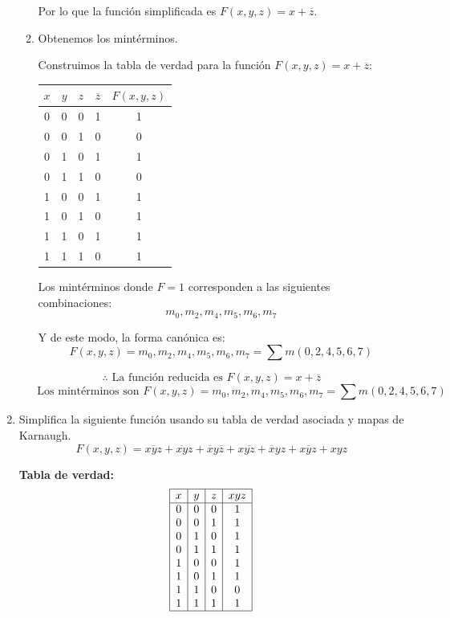 \documentclass[12pt,letterpaper]{article}
\begin{document}
\begin{enumerate}[label=\arabic*.]
\begin{enumerate}[label=\arabic*)]
    Por lo que la funci\'{o}n simplificada es $F(x, y, z) = x + \overline{z}$.

  \item Obtenemos los mint\'{e}rminos.
    
    Construimos la tabla de verdad para la función $F(x, y, z) = x + \overline{z}$:
    \begin{center}
      \begin{tabular}{|c|c|c|c|c|}
        \hline
        $x$ & $y$ & $z$ & $\overline{z}$ & $F(x, y, z)$ \\
        \hline
        0 & 0 & 0 & 1 & 1 \\
        0 & 0 & 1 & 0 & 0 \\
        0 & 1 & 0 & 1 & 1 \\
        0 & 1 & 1 & 0 & 0 \\
        1 & 0 & 0 & 1 & 1 \\
        1 & 0 & 1 & 0 & 1 \\
        1 & 1 & 0 & 1 & 1 \\
        1 & 1 & 1 & 0 & 1 \\
        \hline
      \end{tabular}
    \end{center}
    
    Los mint\'{e}rminos donde $F = 1$ corresponden a las siguientes combinaciones:
    \[
    m_0, m_2, m_4, m_5, m_6, m_7
    \]
    
    Y de este modo, la forma canónica es:
    \[
    F(x, y, z) = m_0, m_2, m_4, m_5, m_6, m_7 = \sum m(0, 2, 4, 5, 6, 7)
    \]

  \end{enumerate}
  
  \[
  \therefore \text{ La funci\'{o}n reducida es } F(x, y, z) = x + \overline{z}
  \]
  \[
  \quad \;   \text{ Los mint\'{e}rminos son } F(x, y, z) = m_0, m_2, m_4, m_5, m_6, m_7 = \sum m(0, 2, 4, 5, 6, 7)
  \]
  
  \newpage
  
\item Simplifica la siguiente función usando su tabla de verdad asociada y mapas de Karnaugh.
  \[
  F(x, y, z) = \overline{xyz} + \overline{xy}z + \overline{x}y\overline{z} + x\overline{yz} + \overline{x}yz + x\overline{y}z + xyz
  \]
  
  \textbf{Tabla de verdad:}
  \[
  \begin{array}{| c | c | c | c |}
    \hline
    x & y & z & xyz \\
    \hline
    0 & 0 & 0 & 1 \\
    0 & 0 & 1 & 1 \\
    0 & 1 & 0 & 1 \\
    0 & 1 & 1 & 1 \\
    1 & 0 & 0 & 1 \\
    1 & 0 & 1 & 1 \\
    1 & 1 & 0 & 0 \\
    1 & 1 & 1 & 1 \\
    \hline
  \end{array}
  \]


\end{enumerate}
\end{document}
